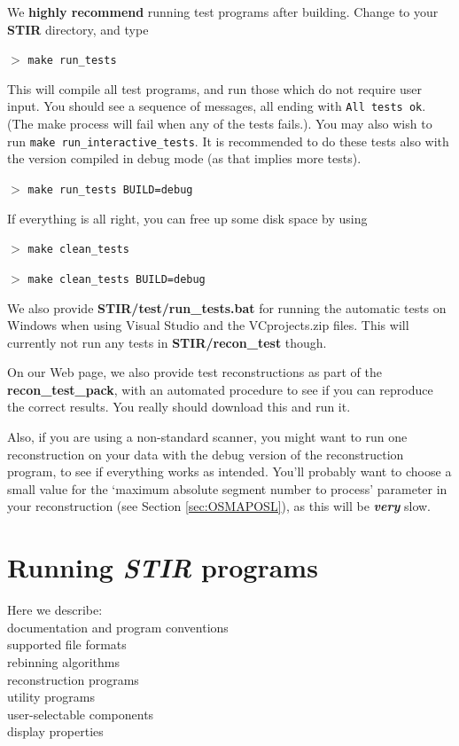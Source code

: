 \documentclass{article}
\newcommand{\cmdline}[1]{\par \noindent $>$ \texttt{#1}\par}
\begin{document}
We \textbf{highly recommend} running test programs after building. Change 
to your \textbf{STIR} directory, and type
\cmdline{make run\_tests}


This will compile all test programs, and run those which do not 
require user input. You should see a sequence of messages, all 
ending with \texttt{All tests ok}. (The make process will fail 
when any of the tests fails.). You may also wish to run \texttt{make 
run\_interactive\_tests}. It is recommended to do these tests 
also with the version compiled in debug mode (as that implies 
more tests). 
\cmdline{make run\_tests BUILD=debug}


If everything is all right, you can free up some disk space by 
using
\cmdline{make clean\_tests}
\cmdline{make clean\_tests BUILD=debug}

We also provide \textbf{STIR/test/run\_tests.bat} for running the automatic 
tests on Windows when using Visual Studio and the VCprojects.zip 
files. This will currently not run any tests in \textbf{STIR/recon\_test} though.


On our Web page, we also provide test reconstructions as part of the
\textbf{recon\_test\_pack}, with an 
automated procedure to see if you can reproduce the correct results. 
You really should download this and run it.


Also, if you are using a non-standard scanner, 
you might want to run one reconstruction on your data with 
the debug version of the reconstruction program, to see if everything 
works as intended. You'll probably want to choose a small value 
for the `maximum absolute segment number to process' parameter 
in your reconstruction (see Section \ref{sec:OSMAPOSL}), as this will be \textbf{\textit{very}} 
slow.


\section{
Running \textit{STIR} programs}

Here we describe:\\
{\textbullet} documentation and program conventions\\
{\textbullet} supported file formats \\
{\textbullet} rebinning algorithms\\
{\textbullet} reconstruction programs\\
{\textbullet} utility programs\\
{\textbullet} user-selectable components\\
{\textbullet} display properties
\end{document}
